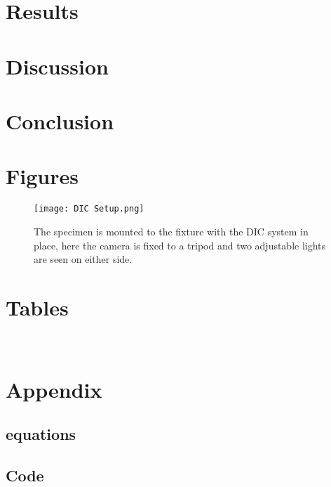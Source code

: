 \documentclass[12pt]{article}
\begin{document}
\section{Results}%

\section{Discussion}%

\section{Conclusion}%

\section{Figures}
\begin{figure}[H]
	\centering
	\texttt{[image: DIC Setup.png]}
	\caption{The specimen is mounted to the fixture with the DIC system in place, here the camera is fixed to a tripod and two adjustable lights are seen on either side.}
	\label{fig:DIC}
\end{figure}
 
\section{Tables}
\
\section{Appendix}

\subsection{equations}


\subsection{Code}

\begin{verbatim}

\end{verbatim}




\end{document}
